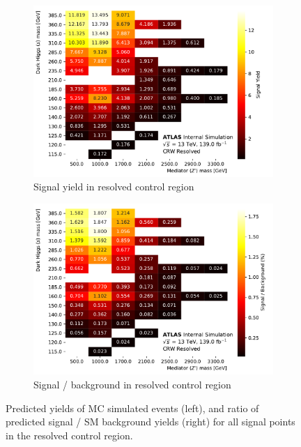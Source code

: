 \begin{figure}[htbp]
  \centering
  \begin{subfigure}{0.45\textwidth}
    \includegraphics[width=\textwidth]{Figures/5/SignalYields_CRW_Resolved.pdf}
    \caption{Signal yield in resolved \wjets control region}\label{fig:signal_yield_CRW_resolved_CR}
    \end{subfigure} \hspace{1em}
  \begin{subfigure}{0.45\textwidth}
    \includegraphics[width=\textwidth]{Figures/5/SignalContaminations_CRW_Resolved.pdf}
    \caption{Signal / background in resolved \wjets control region}\label{fig:signal_over_bkg_CRW_resolved_CR}
    \end{subfigure}
  \caption[Signal contaminations in merged SR and CRW]{Predicted yields of MC simulated events (left), and ratio of predicted signal / SM background yields (right) for all signal points in the resolved \wjets control region.}
  \label{fig:signal_composition_CRW_resolved}
\end{figure}



